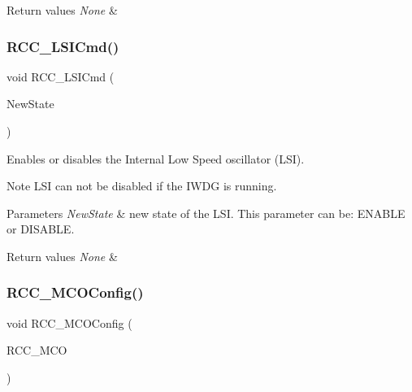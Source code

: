 \begin{DoxyRetVals}{Return values}
{\em None} & \\
\hline
\end{DoxyRetVals}
\mbox{\label{group___r_c_c___private___functions_ga81e3ca29fd154ac2019bba6936d6d5ed}} 
\subsubsection{\texorpdfstring{RCC\_LSICmd()}{RCC\_LSICmd()}}
{\footnotesize\ttfamily void R\+C\+C\+\_\+\+L\+S\+I\+Cmd (\begin{DoxyParamCaption}\item[{\mbox{\hyperlink{group___exported__types_gac9a7e9a35d2513ec15c3b537aaa4fba1}{Functional\+State}}}]{New\+State }\end{DoxyParamCaption})}



Enables or disables the Internal Low Speed oscillator (L\+SI). 

\begin{DoxyNote}{Note}
L\+SI can not be disabled if the I\+W\+DG is running. 
\end{DoxyNote}

\begin{DoxyParams}{Parameters}
{\em New\+State} & new state of the L\+SI. This parameter can be\+: E\+N\+A\+B\+LE or D\+I\+S\+A\+B\+LE. \\
\hline
\end{DoxyParams}

\begin{DoxyRetVals}{Return values}
{\em None} & \\
\hline
\end{DoxyRetVals}
\mbox{\label{group___r_c_c___private___functions_ga8f62b86c6ca8ae6585ba1cec79431fe5}} 
\subsubsection{\texorpdfstring{RCC\_MCOConfig()}{RCC\_MCOConfig()}}
{\footnotesize\ttfamily void R\+C\+C\+\_\+\+M\+C\+O\+Config (\begin{DoxyParamCaption}\item[{uint8\+\_\+t}]{R\+C\+C\+\_\+\+M\+CO }\end{DoxyParamCaption})}



